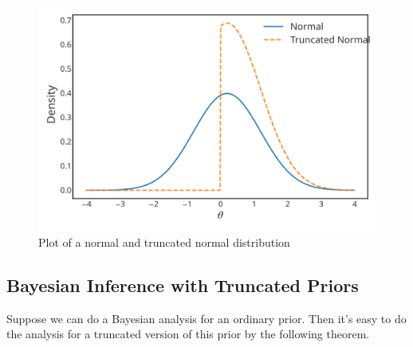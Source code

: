 \begin{figure}[ht]

\includegraphics{images/truncatednormal.svg}
\caption{Plot of a normal and truncated normal distribution}


\end{figure}


\subsection*{Bayesian Inference with Truncated Priors}

Suppose we can do a Bayesian analysis for an ordinary prior.
Then it's easy to do the analysis for a truncated version of this prior by the following theorem.

